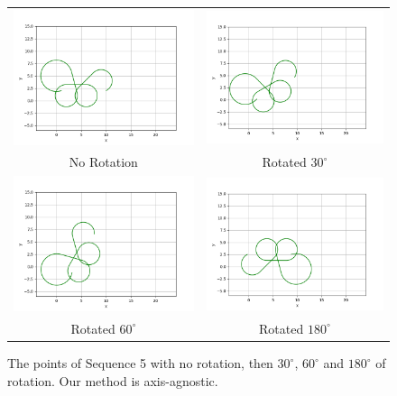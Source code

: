 \documentclass{article}
\begin{document}
\begin{center}
\begin{figure}
\centering
\begin{tabular}{cc}

\includegraphics[width=0.4\linewidth]{Plots/DemoPlot5.png} &
\includegraphics[width=0.4\linewidth]{Plots/DemoPlot5Rotate30.png} \\
No Rotation & Rotated $30^\circ$ \\ %

\includegraphics[width=0.4\linewidth]{Plots/DemoPlot5Rotate60.png} &
\includegraphics[width=0.4\linewidth]{Plots/DemoPlot5Rotate180.png} \\
Rotated $60^\circ$ & Rotated $180^\circ$ \\ %

\end{tabular}
\caption{The points of Sequence 5 with no rotation, then $30^\circ$, $60^\circ$ and $180^\circ$ of rotation. Our method is axis-agnostic.}
\label{fig:axis_agnostic}
\end{figure}
\end{center}
\end{document}
